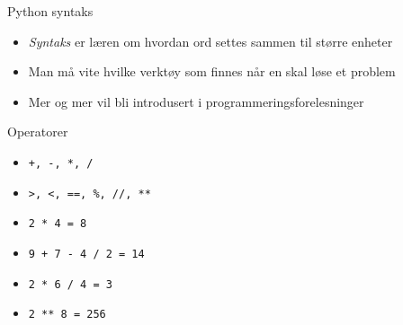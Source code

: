 \documentclass[screen, aspectratio=169]{beamer}
\begin{document}
\begin{frame}{Python syntaks}
	\begin{itemize}
		\item \emph{Syntaks} er læren om hvordan ord settes sammen til større enheter
		\item Man må vite hvilke verktøy som finnes når en skal løse et problem
		\item Mer og mer vil bli introdusert i programmeringsforelesninger
	\end{itemize}
\end{frame}


\begin{frame}[fragile]{Operatorer}
	\begin{itemize}
		\item \lstinline|+, -, *, /|
		\item \lstinline|>, <, ==, %, //, **|
	\end{itemize}
	\begin{itemize}
		\item \lstinline|2 * 4 = 8|
		\item \lstinline|9 + 7 - 4 / 2 = 14|
		\item \lstinline|2 * 6 / 4 = 3|
		\item \lstinline|2 ** 8 = 256|
	\end{itemize}
\end{frame}
\end{document}
